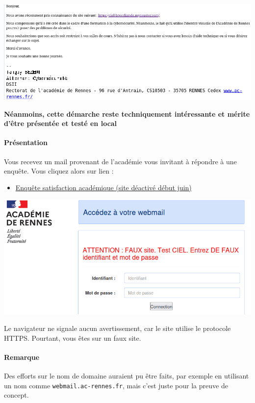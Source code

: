 \documentclass[french, 12pt]{article}%
\newcommand{\itemE}{\item[$\bullet$]}
\begin{document}
\begin{center}
\includegraphics[scale=0.5]{./ressource/mailRssi}
\end{center}
\textbf{Néanmoins, cette démarche reste techniquement intéressante et mérite d'être présentée et testé en local}

\paragraph{Présentation}

Vous recevez un mail provenant de l'académie vous invitant à répondre à une enquête.  Vous cliquez alors sur lien  :

\begin{itemize}
  \itemE \href{https://ciel-broceliande.myasustor.commm}{Enquête satisfaction académique (site déactivé début juin)} 
\end{itemize}

\begin{center}
\includegraphics[scale=0.5]{./ressource/fauxSite}
\end{center}

Le navigateur ne signale aucun avertissement, car le site utilise le protocole HTTPS.  Pourtant, vous êtes sur un faux site.

\paragraph{Remarque}  
Des efforts sur le nom de domaine auraient pu être faits, par exemple en utilisant un nom comme \verb?webmail.ac-rennes.fr?, mais c'est juste pour la preuve de concept.
\end{document}
